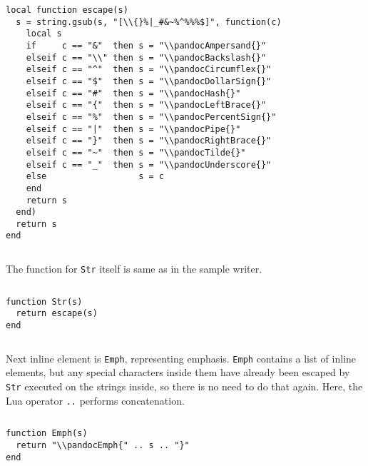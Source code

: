 \documentclass[
  digital,     %
  oneside,     %
  nosansbold,  %
  nocolorbold, %
  lof,         %
  lot,         %
]{fithesis4}
\begin{document}
$ $

\noindent
\lstset{language=[5.3]Lua}
\begin{lstlisting}
local function escape(s)
  s = string.gsub(s, "[\\{}%|_#&~%^%%%$]", function(c)
    local s
    if     c == "&"  then s = "\\pandocAmpersand{}"
    elseif c == "\\" then s = "\\pandocBackslash{}"
    elseif c == "^"  then s = "\\pandocCircumflex{}"
    elseif c == "$"  then s = "\\pandocDollarSign{}"
    elseif c == "#"  then s = "\\pandocHash{}"
    elseif c == "{"  then s = "\\pandocLeftBrace{}"
    elseif c == "%"  then s = "\\pandocPercentSign{}"
    elseif c == "|"  then s = "\\pandocPipe{}"
    elseif c == "}"  then s = "\\pandocRightBrace{}"
    elseif c == "~"  then s = "\\pandocTilde{}"
    elseif c == "_"  then s = "\\pandocUnderscore{}"
    else                  s = c
    end
    return s
  end)
  return s
end
\end{lstlisting}

$ $

\noindent
The function for \texttt{Str} itself is same as in the sample writer.

$ $

\noindent
\lstset{language=[5.3]Lua}
\begin{lstlisting}
function Str(s)
  return escape(s)
end
\end{lstlisting}

$ $

\noindent
Next inline element is \texttt{Emph}, representing emphasis. \texttt{Emph} contains a list of inline elements, but any special characters inside them have already been escaped by \texttt{Str} executed on the strings inside, so there is no need to do that again. Here, the Lua operator \texttt{..} performs concatenation.

$ $

\noindent
\lstset{language=[5.3]Lua}
\begin{lstlisting}
function Emph(s)
  return "\\pandocEmph{" .. s .. "}"
end
\end{lstlisting}
\end{document}
